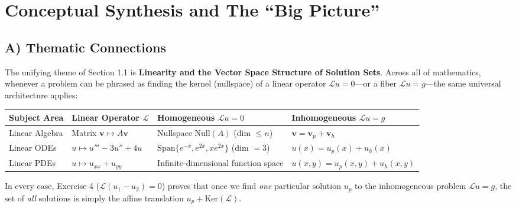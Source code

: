 \documentclass[11pt,a4paper]{article}
\begin{document}
\section{Conceptual Synthesis and The ``Big Picture''}

\subsection{A) Thematic Connections}
The unifying theme of Section 1.1 is \textbf{Linearity and the Vector Space Structure of Solution Sets}. Across all of mathematics, whenever a problem can be phrased as finding the kernel (nullspace) of a linear operator $\mathcal{L}u = 0$—or a fiber $\mathcal{L}u = g$—the same universal architecture applies:
\begin{center}
\renewcommand{\arraystretch}{1.35}
\begin{tabular}{@{}llll@{}}
\toprule
\textbf{Subject Area} & \textbf{Linear Operator $\mathcal{L}$} & \textbf{Homogeneous $\mathcal{L}u = 0$} & \textbf{Inhomogeneous $\mathcal{L}u = g$} \\ \midrule
Linear Algebra & Matrix $\mathbf{v} \mapsto A\mathbf{v}$ & Nullspace $\text{Null}(A)$ (dim $\le n$) & $\mathbf{v} = \mathbf{v}_p + \mathbf{v}_h$ \\
Linear ODEs & $u \mapsto u''' - 3u'' + 4u$ & $\text{Span}\{e^{-x}, e^{2x}, x e^{2x}\}$ (dim $= 3$) & $u(x) = u_p(x) + u_h(x)$ \\
Linear PDEs & $u \mapsto u_{xx} + u_{yy}$ & Infinite-dimensional function space & $u(x,y) = u_p(x,y) + u_h(x,y)$ \\ \bottomrule
\end{tabular}
\end{center}
In every case, Exercise 4 ($\mathcal{L}(u_1 - u_2) = 0$) proves that once we find \emph{one} particular solution $u_p$ to the inhomogeneous problem $\mathcal{L}u = g$, the set of \emph{all} solutions is simply the affine translation $u_p + \text{Ker}(\mathcal{L})$.
\end{document}
